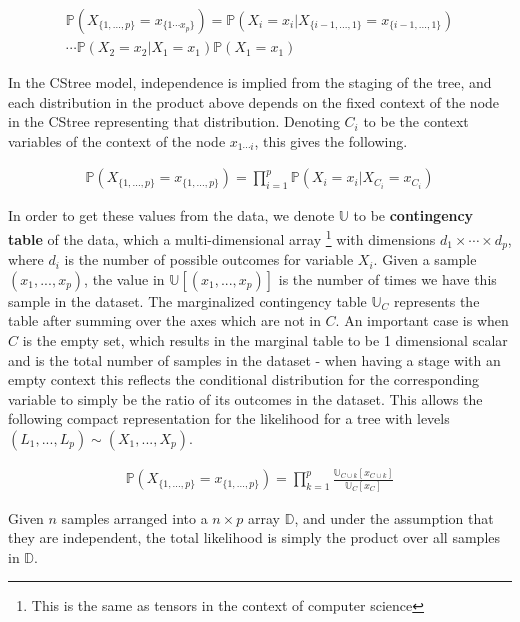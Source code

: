 \documentclass{tufte-book}
\begin{document}
\begin{Definition}
\begin{align*}
\mathbb{P}(X_{\{1,...,p\}}=x_{\{1\cdots x_p\}}) =\mathbb{P}(X_i=x_i|X_{\{i-1,...,1\}}=x_{\{i-1,...,1 \}})\\\cdots\mathbb{P}(X_2=x_2|X_1=x_1)\mathbb{P}(X_1=x_1)
\end{align*}

In the CStree model, independence is implied from the staging of the tree, and each distribution in the product above depends on the fixed context of the node in the CStree representing that distribution. Denoting \(C_i\) to be the context variables of the context of the node \(x_{1\cdots i}\), this gives the following.

\begin{align*}
\mathbb{P}(X_{\{1,...,p\}}=x_{\{1,..., p\}}) =\prod_{i=1}^p \mathbb{P}(X_i=x_i|X_{C_i}=x_{C_i})
\end{align*}


In order to get these values from the data, we denote \(\mathbb{U}\) to be \textbf{contingency table} of the data, which a multi-dimensional array  \footnote{This is the same as tensors in the context of computer science}   with dimensions \(d_1 \times \cdots \times d_p\), where \(d_i\) is the number of possible outcomes for variable \(X_i\). Given a sample \((x_1,...,x_p)\), the value in \(\mathbb{U}[(x_1,...,x_p)]\) is the number of times we have this sample in the dataset. The marginalized contingency table \(\mathbb{U}_C\) represents the table after summing over the axes which are not in \(C\). An important case is when \(C\) is the empty set, which results in the marginal table to be 1 dimensional scalar and is the total number of samples in the dataset - when having a stage with an empty context this reflects the conditional distribution for the corresponding variable to simply be the ratio of its outcomes in the dataset. This allows the following compact representation for the likelihood \cite{duarte-2021-repres-learn} for a tree with levels \((L_1,...,L_p) \sim (X_1,...,X_p)\).

\begin{align*}
\mathbb{P}(X_{\{1,...,p\}}=x_{\{1,..., p\}}) = \prod_{k=1}^p \frac{\mathbb{U}_{C \cup k}[x_{C \cup k}]}{\mathbb{U}_{C}[x_{C}]}
\end{align*}

Given \(n\) samples arranged into a \(n \times p\) array \(\mathbb{D}\), and under the assumption that they are independent, the total likelihood is simply the product over all samples in \(\mathbb{D}\).



\end{Definition}
\end{document}
